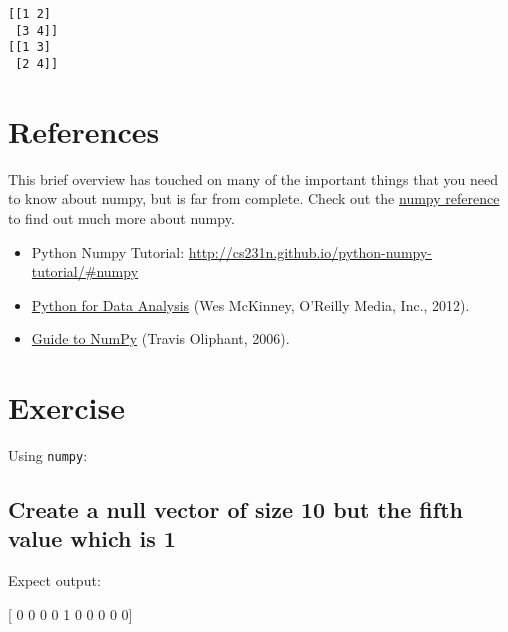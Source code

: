 \documentclass[11pt]{article}
\providecommand{\tightlist}{%
      \setlength{\itemsep}{0pt}\setlength{\parskip}{0pt}}
\newenvironment{Shaded}{}{}
\newcommand{\DecValTok}[1]{\textcolor[rgb]{0.25,0.63,0.44}{{#1}}}
\newcommand{\NormalTok}[1]{{#1}}
\begin{document}
    \begin{Verbatim}[commandchars=\\\{\}]
[[1 2]
 [3 4]]
[[1 3]
 [2 4]]

    \end{Verbatim}

    \section{References}\label{references}

This brief overview has touched on many of the important things that you
need to know about numpy, but is far from complete. Check out the
\href{http://docs.scipy.org/doc/numpy/reference/}{numpy reference} to
find out much more about numpy.

\begin{itemize}
\tightlist
\item
  Python Numpy Tutorial:
  \url{http://cs231n.github.io/python-numpy-tutorial/\#numpy}
\item
  \href{http://shop.oreilly.com/product/0636920023784.do}{Python for
  Data Analysis} (Wes McKinney, O'Reilly Media, Inc., 2012).
\item
  \href{http://csc.ucdavis.edu/~chaos/courses/nlp/Software/NumPyBook.pdf}{Guide
  to NumPy} (Travis Oliphant, 2006).
\end{itemize}

    \section{Exercise}\label{exercise}

    Using \texttt{numpy}:

\subsection{Create a null vector of size 10 but the fifth value which is
1}\label{create-a-null-vector-of-size-10-but-the-fifth-value-which-is-1}

Expect output:

\begin{Shaded}
\begin{Highlighting}[]
\NormalTok{[ }\DecValTok{0} \DecValTok{0} \DecValTok{0} \DecValTok{0} \DecValTok{1} \DecValTok{0} \DecValTok{0} \DecValTok{0} \DecValTok{0} \DecValTok{0}\NormalTok{]}
\end{Highlighting}
\end{Shaded}
\end{document}
